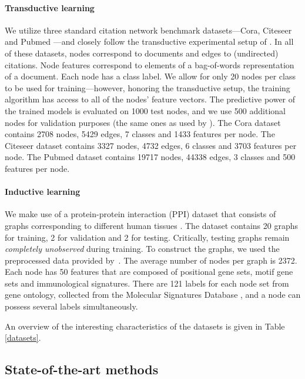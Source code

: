 \documentclass{article} \usepackage{iclr2018_conference,times}
\begin{document}
\paragraph{Transductive learning}
We utilize three standard citation network benchmark datasets---Cora, Citeseer and Pubmed \citep{sen2008collective}---and closely follow the transductive experimental setup of \cite{yang2016revisiting}. In all of these datasets, nodes correspond to documents and edges to (undirected) citations. Node features correspond to elements of a bag-of-words representation of a document. Each node has a class label. We allow for only 20 nodes per class to be used for training---however, honoring the transductive setup, the training algorithm has access to all of the nodes' feature vectors. The predictive power of the trained models is evaluated on 1000 test nodes, and we use 500 additional nodes for validation purposes (the same ones as used by \cite{kipf2016semi}). The Cora dataset contains 2708 nodes, 5429 edges, 7 classes and 1433 features per node. The Citeseer dataset contains 3327 nodes, 4732 edges, 6 classes and 3703 features per node. The Pubmed dataset contains 19717 nodes, 44338 edges, 3 classes and 500 features per node.

\paragraph{Inductive learning}
We make use of a protein-protein interaction (PPI) dataset that consists of graphs corresponding to different human tissues \citep{zitnik2017predicting}. The dataset contains 20 graphs for training, 2 for validation and 2 for testing. Critically, testing graphs remain \emph{completely unobserved} during training. To construct the graphs, we used the preprocessed data provided by~\cite{hamilton2017inductive}. The average number of nodes per graph is 2372. Each node has 50 features that are composed of positional gene sets, motif gene sets and immunological
signatures. There are 121 labels for each node set from gene ontology, collected from the Molecular Signatures Database \citep{subramanian2005gene}, and a node can possess several labels simultaneously. 

An overview of the interesting characteristics of the datasets is given in Table \ref{datasets}.

\subsection{State-of-the-art methods}
\end{document}
